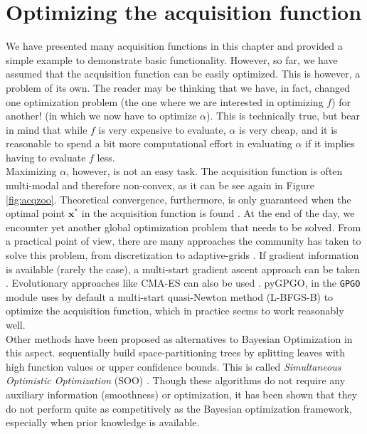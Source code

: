 \documentclass[10pt,a4paper,twoside]{book}
\begin{document}
\section{Optimizing the acquisition function}

We have presented many acquisition functions in this chapter and provided a simple example to demonstrate basic functionality. However, so far, we have assumed that the acquisition function can be easily optimized. This is however, a problem of its own. The reader may be thinking that we have, in fact, changed one optimization problem (the one where we are interested in optimizing $f$) for another! (in which we now have to optimize $\alpha$). This is technically true, but bear in mind that while $f$ is very expensive to evaluate, $\alpha$ is very cheap, and it is reasonable to spend a bit more computational effort in evaluating $\alpha$ if it implies having to evaluate $f$ less.\\

Maximizing $\alpha$, however, is not an easy task. The acquisition function is often multi-modal and therefore non-convex, as it can be see again in Figure \ref{fig:acqzoo}. Theoretical convergence, furthermore, is only guaranteed when the optimal point $\boldsymbol{x}^*$ in the acquisition function is found \cite{Vazquez2010}. At the end of the day, we encounter yet another global optimization problem that needs to be solved. From a practical point of view, there are many approaches the community has taken to solve this problem, from discretization \cite{Snoek2012} to adaptive-grids \cite{Bardenet2010}. If gradient information is available (rarely the case), a multi-start gradient ascent approach can be taken \cite{Lizotte2012}. Evolutionary approaches like CMA-ES can also be used \cite{Hansen2001}. pyGPGO, in the \texttt{GPGO} module uses by default a multi-start quasi-Newton method (L-BFGS-B) to optimize the acquisition function, which in practice seems to work reasonably well. \\

Other methods have been proposed as alternatives to Bayesian Optimization in this aspect. \cite{Kocsis2006,Bubeck2010} sequentially build space-partitioning trees by splitting leaves with high function values or upper confidence bounds. This is called \textit{Simultaneous Optimistic Optimization} (SOO) \cite{Wang2014}. Though these algorithms do not require any auxiliary information (smoothness) or optimization, it has been shown that they do not perform quite as competitively as the Bayesian optimization framework, especially when prior knowledge is available. 
\end{document}
